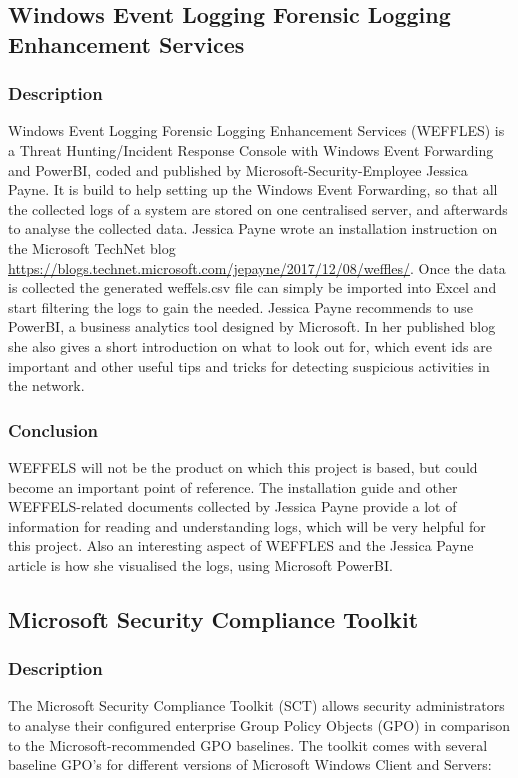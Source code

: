 \subsection{Windows Event Logging Forensic Logging Enhancement Services}
\subsubsection{Description}
Windows Event Logging Forensic Logging Enhancement Services (WEFFLES) is a Threat Hunting/Incident Response Console with Windows Event Forwarding and PowerBI, coded and published by Microsoft-Security-Employee Jessica Payne. It is build to help setting up the Windows Event Forwarding, so that all the collected logs of a system are stored on one centralised server, and afterwards to analyse the collected data. Jessica Payne wrote an installation instruction on the Microsoft TechNet blog \url{https://blogs.technet.microsoft.com/jepayne/2017/12/08/weffles/}. Once the data is collected  the generated weffels.csv file can simply be imported into Excel and start filtering the logs to gain the needed. Jessica Payne recommends to use PowerBI, a business analytics tool designed by Microsoft. In her published blog she also gives a short introduction on what to look out for, which event ids are important and other useful tips and tricks for detecting suspicious activities in the network.
\subsubsection{Conclusion}
WEFFELS will not be the product on which this project is based, but could become an important point of reference. The installation guide and other WEFFELS-related documents collected by Jessica Payne provide a lot of information for reading and understanding logs, which will be very helpful for this project. Also an interesting aspect of WEFFLES and the Jessica Payne article is how she visualised the logs, using Microsoft PowerBI.


\subsection{Microsoft Security Compliance Toolkit}
\subsubsection{Description}
The Microsoft Security Compliance Toolkit (SCT) \cite{SCT} allows security administrators to analyse their configured enterprise Group Policy Objects (GPO) in comparison to the Microsoft-recommended GPO baselines. The toolkit comes with  several baseline GPO's for different versions of Microsoft Windows Client and Servers:


